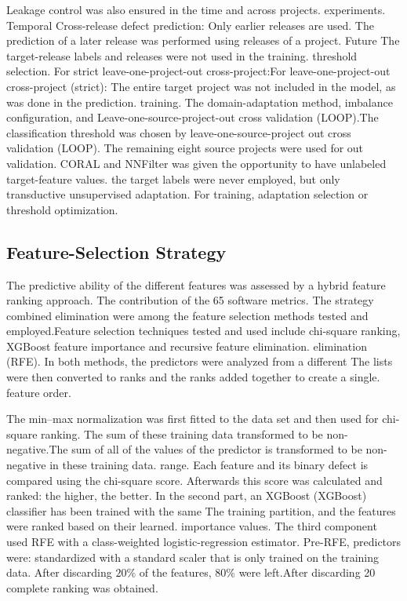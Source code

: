 \documentclass[conference]{IEEEtran}
\begin{document}
Leakage control was also ensured in the time and across projects.
experiments. Temporal Cross-release defect prediction: Only earlier releases are used.
The prediction of a later release was performed using releases of a project. Future
The target-release labels and releases were not used in the training.
threshold selection. For strict leave-one-project-out cross-project:For leave-one-project-out cross-project (strict):
The entire target project was not included in the model, as was done in the prediction.
training. The domain-adaptation method, imbalance configuration, and
Leave-one-source-project-out cross validation (LOOP).The classification threshold was chosen by leave-one-source-project out cross validation (LOOP).
The remaining eight source projects were used for out validation. CORAL and
NNFilter was given the opportunity to have unlabeled target-feature values.
the target labels were never employed, but only transductive unsupervised adaptation.
For training, adaptation selection or threshold optimization.

\subsection{Feature-Selection Strategy}
\label{subsec:feature-selection}

The predictive ability of the different features was assessed by a hybrid feature ranking approach.
The contribution of the 65 software metrics. The strategy combined
elimination were among the feature selection methods tested and employed.Feature selection techniques tested and used include chi-square ranking, XGBoost feature importance and recursive feature elimination.
elimination (RFE). In both methods, the predictors were analyzed from a different
The lists were then converted to ranks and the ranks added together to create a single.
feature order.

The min--max normalization was first fitted to the data set and then used for chi-square ranking.
The sum of these training data transformed to be non-negative.The sum of all of the values of the predictor is transformed to be non-negative in these training data.
range. Each feature and its binary defect is compared using the chi-square score.
Afterwards this score was calculated and ranked: the higher, the better.
In the second part, an XGBoost (XGBoost) classifier has been trained with the same
The training partition, and the features were ranked based on their learned.
importance values. The third component used RFE with a class-weighted
logistic-regression estimator. Pre-RFE, predictors were:
standardized with a standard scaler that is only trained on the training data.
After discarding \(20\%\) of the features, \(80\%\) were left.After discarding 20%
complete ranking was obtained.
\end{document}
